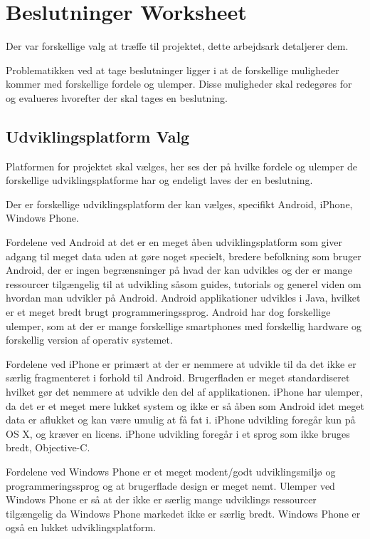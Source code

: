 \chapter{Beslutninger Worksheet}
Der var forskellige valg at træffe til projektet, dette arbejdsark detaljerer dem.
 
Problematikken ved at tage beslutninger ligger i at de forskellige muligheder kommer med forskellige fordele og ulemper.
Disse muligheder skal redegøres for og evalueres hvorefter der skal tages en beslutning.

\section{Udviklingsplatform Valg}
Platformen for projektet skal vælges, her ses der på hvilke fordele og ulemper de forskellige udviklingsplatforme har og endeligt laves der en beslutning.

Der er forskellige udviklingsplatform der kan vælges, specifikt Android, iPhone, Windows Phone. 

Fordelene ved Android at det er en meget åben udviklingsplatform som giver adgang til meget data uden at gøre noget specielt, bredere befolkning som bruger Android, der er ingen begrænsninger på hvad der kan udvikles og der er mange ressourcer tilgængelig til at udvikling såsom guides, tutorials og generel viden om hvordan man udvikler på Android. Android applikationer udvikles i Java, hvilket er et meget bredt brugt programmeringssprog.
Android har dog forskellige ulemper, som at der er mange forskellige smartphones med forskellig hardware og forskellig version af operativ systemet. 

Fordelene ved iPhone er primært at der er nemmere at udvikle til da det ikke er særlig fragmenteret i forhold til Android. Brugerfladen er meget standardiseret hvilket gør det nemmere at udvikle den del af applikationen. 
iPhone har ulemper, da det er et meget mere lukket system og ikke er så åben som Android idet meget data er aflukket og kan være umulig at få fat i. iPhone udvikling foregår kun på OS X, og kræver en licens. iPhone udvikling foregår i et sprog som ikke bruges bredt, Objective-C.

Fordelene ved Windows Phone er et meget modent/godt udviklingsmiljø og programmeringssprog og at brugerflade design er meget nemt. 
Ulemper ved Windows Phone er så at der ikke er særlig mange udviklings ressourcer tilgængelig da Windows Phone markedet ikke er særlig bredt. Windows Phone er også en lukket udviklingsplatform.

